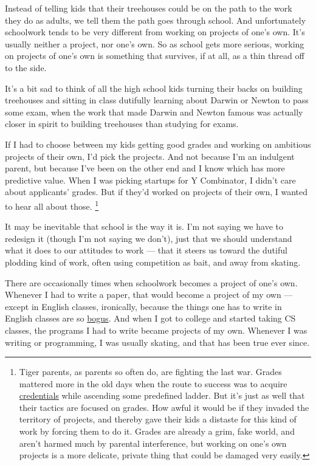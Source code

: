 \documentclass[12pt]{book}
\begin{document}
Instead of telling kids that their treehouses could be on the path to
the work they do as adults, we tell them the path goes through school.
And unfortunately schoolwork tends to be very different from working on
projects of one's own. It's usually neither a project, nor one's own. So
as school gets more serious, working on projects of one's own is
something that survives, if at all, as a thin thread off to the side.

It's a bit sad to think of all the high school kids turning their backs
on building treehouses and sitting in class dutifully learning about
Darwin or Newton to pass some exam, when the work that made Darwin and
Newton famous was actually closer in spirit to building treehouses than
studying for exams.

If I had to choose between my kids getting good grades and working on
ambitious projects of their own, I'd pick the projects. And not because
I'm an indulgent parent, but because I've been on the other end and I
know which has more predictive value. When I was picking startups for Y
Combinator, I didn't care about applicants' grades. But if they'd worked
on projects of their own, I wanted to hear all about those.
\footnote{Tiger parents, as parents so often do, are fighting the last
war. Grades mattered more in the old days when the route to success was
to acquire \href{credentials.html}{credentials} while ascending some
predefined ladder. But it's just as well that their tactics are focused
on grades. How awful it would be if they invaded the territory of
projects, and thereby gave their kids a distaste for this kind of work
by forcing them to do it. Grades are already a grim, fake world, and
aren't harmed much by parental interference, but working on one's own
projects is a more delicate, private thing that could be damaged very
easily.}

It may be inevitable that school is the way it is. I'm not saying we
have to redesign it (though I'm not saying we don't), just that we
should understand what it does to our attitudes to work --- that it
steers us toward the dutiful plodding kind of work, often using
competition as bait, and away from skating.

There are occasionally times when schoolwork becomes a project of one's
own. Whenever I had to write a paper, that would become a project of my
own --- except in English classes, ironically, because the things one
has to write in English classes are so \href{essay.html}{bogus}. And
when I got to college and started taking CS classes, the programs I had
to write became projects of my own. Whenever I was writing or
programming, I was usually skating, and that has been true ever since.
\end{document}
